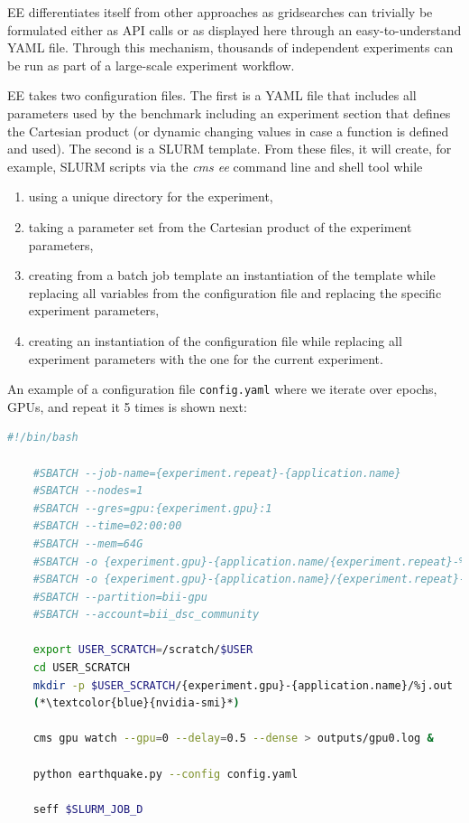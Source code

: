 \documentclass[utf8]{FrontiersinVancouver} %
\begin{document}
EE differentiates itself from other approaches as gridsearches can trivially be formulated either as API calls or as displayed here through an easy-to-understand YAML file. Through this mechanism, thousands of independent experiments can be run as part of a large-scale experiment workflow.

EE takes two configuration files. The first is a YAML file that includes all parameters used by the benchmark including an experiment section that defines the Cartesian product (or dynamic changing values in case a function is defined and used). The second is a SLURM template. From these files, it will create, for example, SLURM scripts via the {\em cms ee} command line and shell tool while

\begin{enumerate}
  \item using a unique directory for the experiment,
  \item taking a parameter set from the Cartesian product of the experiment parameters,
  \item creating from a batch job template an instantiation of the template while replacing all variables from the configuration file    and replacing the specific experiment parameters,
  \item creating an instantiation of the configuration file while replacing all experiment parameters with the one for the current experiment.
\end{enumerate}

An example of a configuration file \verb|config.yaml| where we iterate over epochs, GPUs, and repeat it 5 times is shown next:

\begin{lstlisting}[language=sh]
    #!/bin/bash

    #SBATCH --job-name={experiment.repeat}-{application.name}
    #SBATCH --nodes=1
    #SBATCH --gres=gpu:{experiment.gpu}:1
    #SBATCH --time=02:00:00
    #SBATCH --mem=64G
    #SBATCH -o {experiment.gpu}-{application.name/{experiment.repeat}-%j.out
    #SBATCH -o {experiment.gpu}-{application.name}/{experiment.repeat}-%j.err
    #SBATCH --partition=bii-gpu
    #SBATCH --account=bii_dsc_community

    export USER_SCRATCH=/scratch/$USER
    cd USER_SCRATCH
    mkdir -p $USER_SCRATCH/{experiment.gpu}-{application.name}/%j.out
    (*\textcolor{blue}{nvidia-smi}*)

    cms gpu watch --gpu=0 --delay=0.5 --dense > outputs/gpu0.log &

    python earthquake.py --config config.yaml

    seff $SLURM_JOB_D
\end{lstlisting}
\end{document}
